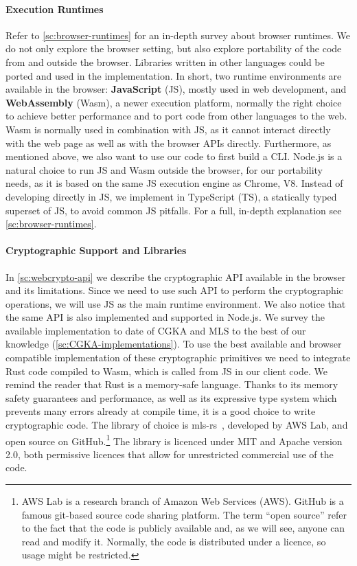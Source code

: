 \paragraph{Execution Runtimes} 
Refer to \cref{sc:browser-runtimes} for an in-depth survey about browser runtimes.
We do not only explore the browser setting, but also explore
portability of the code from and outside the browser.
Libraries written in other languages could be ported and used in the implementation.
In short, two runtime environments are available in the browser:
\textbf{JavaScript} (JS), mostly used in web development, and \textbf{WebAssembly} (Wasm),
a newer execution platform, normally the right choice to achieve better performance
and to port code from other languages to the web. Wasm is normally
used in combination with JS, as it cannot interact directly with
the web page as well as with the browser APIs directly. Furthermore, 
as mentioned above, we also want to use our code to first build a CLI.
Node.js is a natural choice to run JS and Wasm outside the browser,
for our portability needs, as it is based on the same 
JS execution engine as Chrome, V8.
Instead of developing directly in JS, we implement in TypeScript (TS),
a statically typed superset of JS, to avoid common JS pitfalls.
For a full, in-depth explanation see \cref{sc:browser-runtimes}.

\paragraph{Cryptographic Support and Libraries}
In \cref{sc:webcrypto-api} we describe the cryptographic API
available in the browser and its limitations. Since we need to use
such API to perform the cryptographic operations, we will use JS
as the main runtime environment.
We also notice that the same API is also implemented and supported in Node.js.
We survey the available 
implementation to date of CGKA and MLS
to the best of our knowledge (\cref{sc:CGKA-implementations}).
To use the best available
and browser compatible implementation of these cryptographic
primitives we need to integrate Rust code compiled to Wasm, which is
called from JS in our client code. We remind the reader that
Rust is a memory-safe language.
Thanks to its memory safety guarantees and performance,
as well as its expressive type system which prevents many errors already at compile time,
it is a good choice to write cryptographic code.
The library of choice is mls-rs~\cite{AWSMLSGroup}, developed by AWS Lab, 
and open source on GitHub.\footnote{AWS Lab is a research branch of Amazon Web Services (AWS). GitHub is a famous git-based source code sharing platform. The term ``open source'' refer to the fact that the code is publicly available and, as we will see, anyone can read and modify it. Normally, the code is distributed under a licence, so usage might be restricted.}
The library is licenced under MIT and Apache version 2.0, both
permissive licences that allow for unrestricted commercial use of the code.

